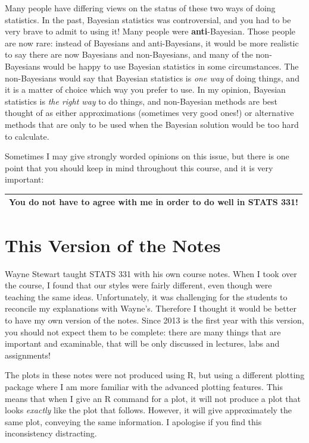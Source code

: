 Many
people have differing views on the status of these two ways of doing statistics.
In the past, Bayesian statistics was controversial, and you had to be very
brave to admit to using it! Many people were {\bf anti}-Bayesian.
Those people are now
rare: instead of Bayesians and anti-Bayesians, it would be more realistic to
say there are now Bayesians and non-Bayesians, and many of the non-Bayesians
would be happy to use Bayesian statistics in some circumstances.
The non-Bayesians would say that
Bayesian statistics is {\it one way} of doing things, and it is a matter of
choice which way you prefer to use. In my opinion, Bayesian
statistics is {\it the right way} to do things, and non-Bayesian methods are
best thought of as either approximations (sometimes very good ones!)
or alternative methods that are only to be used when the Bayesian solution
would be too hard to calculate.

Sometimes I may give strongly worded opinions on this issue, but
there is one point that you should keep in mind throughout
this course, and it is very important:

\begin{center}
\begin{tabular}{|c|}
\hline
{\bf You do not have to agree with me in order to do well in STATS 331!}\\
\hline
\end{tabular}
\end{center}

\section{This Version of the Notes}
Wayne Stewart taught STATS 331 with his own course notes. When I took over the
course, I found that our styles were fairly different, even though were teaching
the same ideas. Unfortunately, it was challenging for the students to reconcile
my explanations with Wayne's. Therefore I thought it would be better to have
my own version of the notes. Since 2013 is the first year with this version, you
should not expect them to be complete: there are many things that are important
and examinable, that will be only discussed in lectures, labs and assignments!

The plots in these notes were not produced using R, but using a different
plotting package where I am more familiar with the advanced plotting features.
This means that when I give an R command for a plot,
it will not produce a plot that looks {\it exactly} like the plot that follows.
However, it will give approximately the same plot, conveying the same information.
I apologise if you find this inconsistency distracting.


